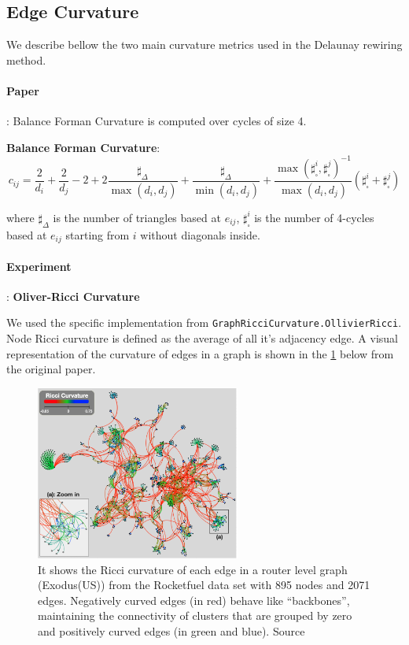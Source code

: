 \documentclass{article}
\theoremstyle{plain}
\theoremstyle{definition}
\theoremstyle{remark}
\begin{document}

\subsection{Edge Curvature}
\label{app:curvature}
We describe bellow the two main curvature metrics used in the Delaunay rewiring method.
\paragraph{Paper}: 
Balance Forman Curvature \cite{topping2022understandingoversquashingbottlenecksgraphs} 
is computed over cycles of size 4.
    
\textbf{Balance Forman Curvature}:
    $$c_{ij}= \frac{2}{d_i} + \frac{2}{d_j} - 2 + 2 \frac{\sharp_{\Delta}}{\max(d_i, d_j)} + 
            \frac{\sharp_{\Delta}}{\min(d_i, d_j)} + 
            \frac{\max(\sharp_{\square}^i,\sharp_{\square}^j)^{-1}}{\max(d_i, d_j)}
            (\sharp_{\square}^i + \sharp_{\square}^j)
    $$

    where $\sharp_{\Delta}$ is the number of triangles based at $e_{ij}$, 
    $\sharp_{\square}^i$ is the number of 4-cycles based at $e_{ij}$ starting from $i$
    without diagonals inside.


\paragraph{Experiment}: 
\textbf{Oliver-Ricci Curvature} \cite{ni2015riccicurvatureinternettopology} 

We used the specific implementation from \texttt{GraphRicciCurvature.OllivierRicci}. 
Node Ricci curvature is defined as the average of all it’s adjacency edge. A visual
representation of the curvature of edges in a graph is shown in the \ref{fig:ricci_edge_curvature} below 
from the original paper.
\begin{figure}[ht!]
    \center
    \includegraphics[width=0.6\textwidth]{figures/Riccicurvature.png}
    \caption{ It shows the Ricci curvature of each edge in a router level graph
    (Exodus(US)) from the Rocketfuel data set with 895 nodes and 2071
    edges. Negatively curved edges (in red) behave like “backbones”,
    maintaining the connectivity of clusters that are grouped by zero and
    positively curved edges (in green and blue). Source \cite{ni2015riccicurvatureinternettopology}}
    \label{fig:ricci_edge_curvature}
\end{figure}
\end{document}
